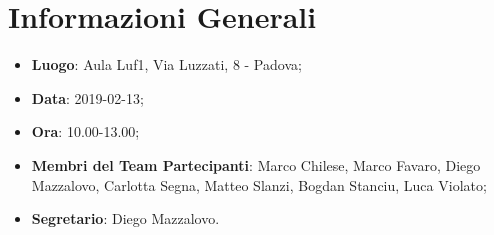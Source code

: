 \section{Informazioni Generali}

\begin{itemize}
	\item \textbf{Luogo}: Aula Luf1, Via Luzzati, 8 - Padova; 
	\item \textbf{Data}: 2019-02-13; 
	\item \textbf{Ora}: 10.00-13.00; 
	\item \textbf{Membri del Team Partecipanti}: Marco Chilese, Marco Favaro, Diego Mazzalovo, Carlotta Segna, Matteo Slanzi, Bogdan Stanciu, Luca Violato; 
	\item \textbf{Segretario}: Diego Mazzalovo. 
\end{itemize}